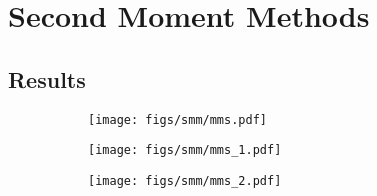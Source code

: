 \documentclass[../doc.tex]{subfiles}
\begin{document}
\chapter{Second Moment Methods}

\section{Results}

\begin{figure}
\centering
\begin{subfigure}{.4\textwidth}
	\centering
	\texttt{[image: figs/smm/mms.pdf]}
	\caption{}
\end{subfigure}
\begin{subfigure}{.4\textwidth}
	\centering
	\texttt{[image: figs/smm/mms\_1.pdf]}
	\caption{}
\end{subfigure}
\begin{subfigure}{.4\textwidth}
	\centering
	\texttt{[image: figs/smm/mms\_2.pdf]}
	\caption{}
\end{subfigure}
\end{figure}

\begin{table}
\centering
\caption{}
\label{}

\end{table}

\begin{table}
\centering
\caption{}
\label{}

\end{table}

\begin{table}
\centering
\caption{}
\label{}

\end{table}

\begin{table}
\centering
\caption{}
\label{}

\end{table}

\begin{table}
\centering
\caption{}
\label{}
\begin{adjustbox}{max width = \textwidth}

\end{adjustbox}
\end{table}

\begin{table}
\centering
\caption{}
\label{}

\end{table}
\end{document}
